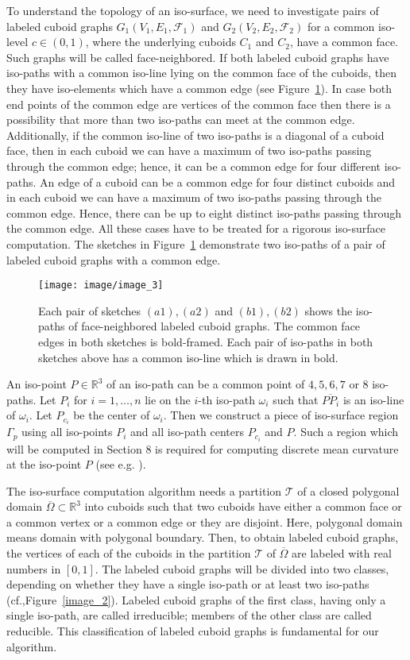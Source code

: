\documentclass[a4paper,11pt]{article}
\begin{document}
To understand the topology of an iso-surface, we need to investigate pairs of labeled cuboid graphs
$G_1(V_1,E_1,\mathcal{F}_1)$ and $G_2(V_2,E_2,\mathcal{F}_2)$ for a common iso-level $c\in (0,1)$,
where the underlying cuboids $C_1$ and $C_2$, have a common face. Such graphs will be called
face-neighbored. If both labeled cuboid graphs have iso-paths with a common iso-line lying on the
common face of the cuboids, then they have iso-elements which have a common edge
(see Figure~\ref{image_3}). In case both end points of the common edge
are vertices of the common face then there is a possibility that more than two iso-paths can meet at
the common edge. Additionally, if the common iso-line of two iso-paths is a diagonal of a cuboid face,
then in each cuboid we can have a maximum of two iso-paths passing through the common edge; hence, it
can be a common edge for four different iso-paths. An edge of a cuboid can be a common edge for four
distinct cuboids and in each cuboid we can have a maximum of two iso-paths passing
through the common edge. Hence, there can be up to eight distinct iso-paths passing through the common edge.
All these cases have to be treated for a rigorous iso-surface computation. The sketches in Figure~\ref{image_3}
demonstrate two iso-paths of a pair of labeled cuboid graphs with a common edge.
\begin{figure}[!ht]
\texttt{[image: image/image\_3]}
\caption{Each pair of sketches $(a1), (a2)$ and $(b1), (b2)$ shows the iso-paths of
face-neighbored labeled cuboid graphs. The common face edges in both sketches is bold-framed.
Each pair of iso-paths in both sketches above has a common iso-line which is drawn in bold.}
\label{image_3}
\end{figure}
\FloatBarrier

An iso-point $P\in\mathbb{R}^3$ of an iso-path can be a common point of $4,5,6,7$ or $8$ iso-paths.
Let $P_i$ for $i=1,\ldots,n$ lie on the $i$-th iso-path $\omega_i$ such that $\overline{PP_i}$ is
an iso-line of $\omega_i$. Let $P_{c_i}$ be the center of $\omega_i$. Then we construct a
piece of iso-surface region $\Gamma_p$ using all iso-points $P_i$ and all iso-path centers
$P_{c_i}$ and $P$. Such a region which will be computed in Section 8 is required for computing
discrete mean curvature at the iso-point $P$ (see e.g. \cite{Meyer02Vismath}).

The iso-surface computation algorithm needs a partition $\mathcal{T}$ of a closed polygonal domain
$\overline{\Omega}\subset\mathbb{R}^3$ into cuboids such that two cuboids have either a common face or
a common vertex or a common edge or they are disjoint. Here, polygonal domain means domain with
polygonal boundary. Then, to obtain labeled cuboid graphs, the vertices of each of the cuboids in
the partition $\mathcal{T}$ of $\overline{\Omega}$ are labeled with real numbers in $[0,1]$. The labeled
cuboid graphs will be divided into two classes, depending on whether they have a single iso-path
or at least two iso-paths (cf.,Figure~\ref{image_2}).
Labeled cuboid graphs of the first class, having only a single iso-path, are called irreducible;
members of the other class are called reducible. This classification of labeled cuboid graphs is
fundamental for our algorithm.
\end{document}

